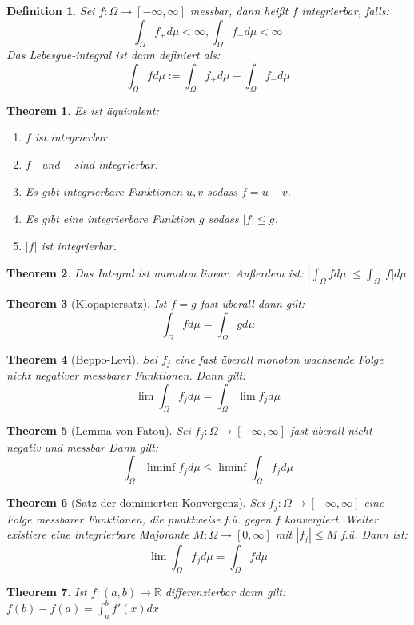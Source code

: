 \documentclass[10pt,a4paper]{article}
\newtheorem{theorem}{Theorem}
\newtheorem{definition}{Definition}
\begin{document}
\begin{definition}
	Sei $f: \Omega \to [-\infty, \infty]$ messbar, dann heißt $f$ integrierbar, falls:
	$$\int_\Omega f_+ d\mu < \infty, \int_\Omega f_- d\mu < \infty$$
	Das Lebesgue-integral ist dann definiert als:
	$$\int_\Omega f d\mu := \int_\Omega f_+ d\mu - \int_\Omega f_- d\mu$$
\end{definition}
\begin{theorem}
	Es ist äquivalent:
	\begin{enumerate}
		\item $f$ ist integrierbar
		\item $f_+$ und $_-$ sind integrierbar.
		\item Es gibt integrierbare Funktionen $u, v$ sodass $f = u-v$.
		\item Es gibt eine integrierbare Funktion $g$ sodass $|f| \leq g$.
		\item $|f|$ ist integrierbar.
	\end{enumerate}
\end{theorem}
\begin{theorem}
	Das Integral ist monoton linear. Außerdem ist: $|\int_\Omega f d\mu| \leq \int_\Omega |f| d\mu$
\end{theorem}
\begin{theorem}[Klopapiersatz]
	Ist $f= g$ fast überall dann gilt: $$\int_\Omega f d\mu = \int_\Omega g d\mu$$
\end{theorem}
\begin{theorem}[Beppo-Levi]
	Sei $f_j$ eine fast überall monoton wachsende Folge nicht negativer messbarer Funktionen. Dann gilt:
	$$\lim \int_\Omega f_j d\mu = \int_\Omega\lim f_j d\mu$$
\end{theorem}
\begin{theorem}[Lemma von Fatou]
	Sei $f_j: \Omega \to [-\infty, \infty]$ fast überall nicht negativ und messbar Dann gilt:
	$$\int_\Omega \liminf f_j d\mu \leq \liminf \int_\Omega f_jd \mu$$
\end{theorem}
\begin{theorem}[Satz der dominierten Konvergenz]
	Sei $f_j: \Omega \to [-\infty, \infty]$ eine Folge messbarer Funktionen, die punktweise f.ü. gegen $f$ konvergiert. Weiter existiere eine integrierbare Majorante $M: \Omega \to[0, \infty]$ mit $|f_j| \leq M$	f.ü. Dann ist: 
	$$\lim\int_\Omega f_j d\mu = \int_\Omega f d\mu$$
\end{theorem}
\begin{theorem}
	Ist $f: (a, b) \to \mathbb{R}$ differenzierbar dann gilt: $f(b) - f(a) = \int_{a}^{b}f'(x)dx$
\end{theorem}
\end{document}
